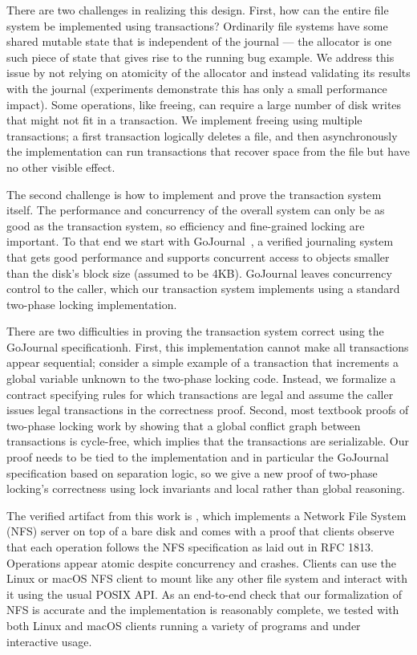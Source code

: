 There are two challenges in realizing this design. First, how can the entire
file system be implemented using transactions? Ordinarily file systems have some
shared mutable state that is independent of the journal --- the allocator is one
such piece of state that gives rise to the running bug example. We address this
issue by not relying on atomicity of the allocator and instead validating its
results with the journal (experiments demonstrate this has only a small
performance impact). Some operations, like freeing, can require a large number
of disk writes that might not fit in a transaction. We implement freeing using
multiple transactions; a first transaction logically deletes a file, and then
asynchronously the implementation can run transactions that recover space from
the file but have no other visible effect.

The second challenge is how to implement and prove the transaction system
itself. The performance and concurrency of the overall system can only be as
good as the transaction system, so efficiency and fine-grained locking are
important. To that end we start with GoJournal~\cite{chajed:gojournal}, a
verified journaling system that gets good performance and supports concurrent
access to objects smaller than the disk's block size (assumed to be 4KB).
GoJournal leaves concurrency control to the caller, which our transaction system
implements using a standard two-phase locking implementation.

There are two difficulties in proving the transaction system correct using the
GoJournal specificationh. First, this implementation cannot make all
transactions appear sequential; consider a simple example of a transaction that
increments a global variable unknown to the two-phase locking code. Instead, we
formalize a contract specifying rules for which transactions are legal and
assume the caller issues legal transactions in the correctness proof. Second,
most textbook proofs of two-phase locking work by showing that a global conflict
graph between transactions is cycle-free, which implies that the transactions
are serializable. Our proof needs to be tied to the implementation and in
particular the GoJournal specification based on separation logic, so we give a
new proof of two-phase locking's correctness using lock invariants and local
rather than global reasoning.

The verified artifact from this work is \sys, which implements a Network File
System (NFS) server on top of a bare disk and comes with a proof that clients
observe that each operation follows the NFS specification as laid out in RFC
1813. Operations appear atomic despite concurrency and crashes. Clients can use
the Linux or macOS NFS client to mount \sys like any other file system and
interact with it using the usual POSIX API.
As an end-to-end check that our formalization of NFS is
accurate and the implementation is reasonably complete, we tested with both Linux
and macOS clients running a variety of programs and under interactive usage.

